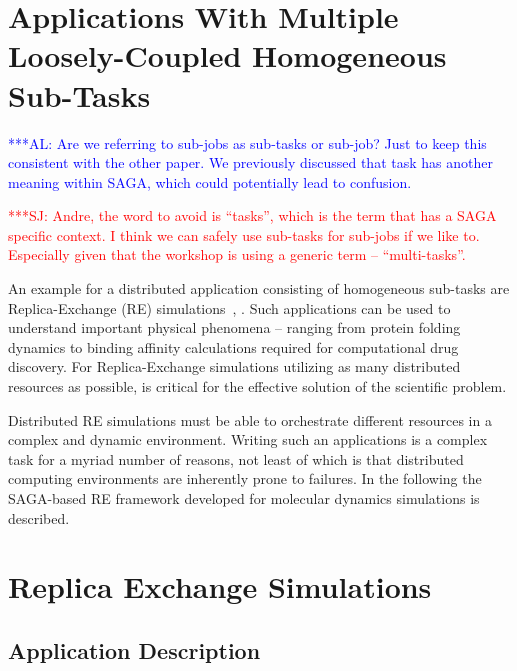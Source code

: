 \documentclass[conference,final]{IEEEtran}
\newcommand{\alnote}[1]{ {\textcolor{blue} { ***AL: #1 }}}
\newcommand{\jhanote}[1]{ {\textcolor{red} { ***SJ: #1 }}}
\newcommand{\alnote}[1]{}
\newcommand{\jhanote}[1]{}
\begin{document}
\section{Applications With Multiple Loosely-Coupled Homogeneous
  Sub-Tasks}  

\alnote{Are we referring to sub-jobs as sub-tasks or sub-job? Just to
  keep this consistent with the other paper. We previously discussed
  that task has another meaning within SAGA, which could potentially
  lead to confusion.}
  
\jhanote{Andre, the word to avoid is ``tasks'', which is the term that
  has a SAGA specific context. I think we can safely use sub-tasks for
  sub-jobs if we like to. Especially given that the workshop is using
  a generic term -- ``multi-tasks''.}

An example for a distributed application consisting of homogeneous
sub-tasks are Replica-Exchange (RE) simulations~\cite{Sugita:1999rm},
\cite{hansmann}. Such applications can be used to understand important
physical phenomena -- ranging from protein folding dynamics to binding
affinity calculations required for computational drug discovery.  For
Replica-Exchange simulations utilizing as many distributed resources
as possible, is critical for the effective solution of the scientific
problem.

Distributed RE simulations must be able to orchestrate different
resources in a complex and dynamic environment.  Writing such an
applications is a complex task for a myriad number of reasons, not
least of which is that distributed computing environments are
inherently prone to failures. In the following the SAGA-based RE
framework developed for molecular dynamics simulations is described.

\section{Replica Exchange Simulations}
\subsection{Application Description}
\end{document}
